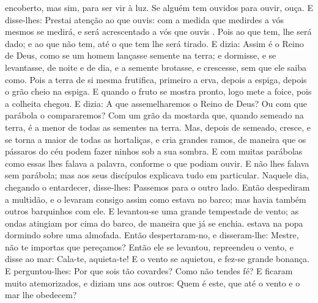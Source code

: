 {{} encoberto, mas sim, para ser vir à luz.
  Se alguém tem ouvidos para ouvir, ouça.
  E disse-lhes: Prestai atenção ao que ouvis: com a medida que medirdes a vós mesmos se medirá, e será acrescentado a vós que ouvis .
  Pois ao que tem, lhe será dado; e ao que não tem, até o que tem lhe será tirado.
  E dizia: Assim é o Reino de Deus, como se um homem lançasse semente na terra;
  e dormisse, e se levantasse, de noite e de dia, e a semente brotasse, e crescesse, sem que ele saiba como.
  Pois a terra de si mesma frutifica, primeiro a erva, depois a espiga, depois o grão cheio na espiga.
  E quando o fruto se mostra pronto, logo mete a foice, pois a colheita chegou.
  E dizia: A que assemelharemos o Reino de Deus? Ou com que parábola o compararemos?
  Com um grão da mostarda que, quando semeado na terra, é a menor de todas as sementes na terra.
  Mas, depois de semeado, cresce, e se torna a maior de todas as hortaliças, e cria grandes ramos, de maneira que os pássaros do céu podem fazer ninhos sob a sua sombra.
  E com muitas parábolas como essas
{} lhes falava a palavra, conforme o que podiam ouvir.
  E não lhes falava sem parábola; mas aos seus discípulos explicava tudo em particular.
  Naquele dia, chegando o entardecer, disse-lhes: Passemos para o outro lado.
  Então despediram a multidão, e o levaram consigo assim como estava no barco; mas havia também outros barquinhos com ele.
  E levantou-se uma grande tempestade de vento; as ondas atingiam por cima do barco, de maneira que já se enchia.
   estava na popa dormindo sobre uma almofada. Então despertaram-no, e disseram-lhe: Mestre, não te importas que pereçamos?
  Então ele se levantou, repreendeu o vento, e disse ao mar: Cala-te, aquieta-te! E o vento se aquietou, e fez-se grande bonança.
  E perguntou-lhes: Por que sois tão covardes? Como não tendes fé?
  E ficaram muito atemorizados, e diziam uns aos outros: Quem é este, que até o vento e o mar lhe obedecem?
\par }

